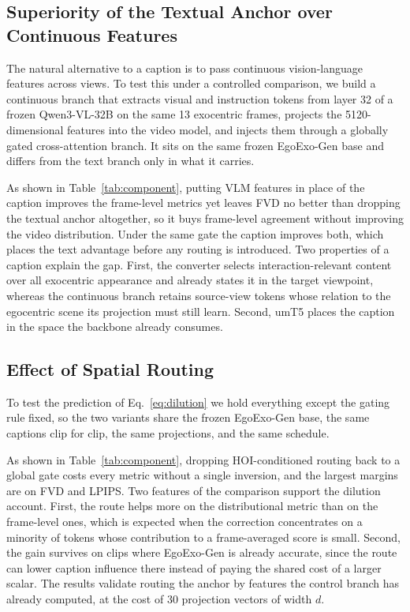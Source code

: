 \documentclass{article}
\begin{document}
\subsection{Superiority of the Textual Anchor over Continuous Features}
\label{sec:modality}

The natural alternative to a caption is to pass continuous vision-language
features across views. To test this under a controlled comparison, we build a
continuous branch that extracts visual and instruction tokens from layer 32 of a
frozen Qwen3-VL-32B on the same 13 exocentric frames, projects the
5120-dimensional features into the video model, and injects them through a
globally gated cross-attention branch. It sits on the same frozen EgoExo-Gen base
and differs from the text branch only in what it carries.

As shown in Table~\ref{tab:component}, putting VLM features in place of the
caption improves the frame-level metrics yet leaves FVD no better than dropping
the textual anchor altogether, so it buys frame-level agreement without improving the
video distribution. Under the same gate the caption improves both, which places the
text advantage before any routing is introduced. Two properties of a caption explain
the gap. First, the converter selects interaction-relevant content over all
exocentric appearance and already states it in the target viewpoint, whereas the
continuous branch retains source-view tokens whose relation to the egocentric
scene its projection must still learn. Second, umT5 places the caption in the
space the backbone already consumes.

\subsection{Effect of Spatial Routing}
\label{sec:effect-routing}

To test the prediction of Eq.~\ref{eq:dilution} we hold everything except the
gating rule fixed, so the two variants share the frozen EgoExo-Gen base, the same
captions clip for clip, the same projections, and the same schedule.

As shown in Table~\ref{tab:component}, dropping HOI-conditioned routing back to a
global gate costs every metric without a single inversion, and the largest
margins are on FVD and LPIPS. Two features of the comparison support the dilution account. First, the route helps more on the
distributional metric than on the frame-level ones, which is expected when the
correction concentrates on a minority of tokens whose contribution to a
frame-averaged score is small. Second, the gain survives on clips where
EgoExo-Gen is already accurate, since the route can lower caption influence there
instead of paying the shared cost of a larger scalar. The results validate
routing the anchor by features the control branch has already computed, at the
cost of $30$ projection vectors of width $d$.
\end{document}
